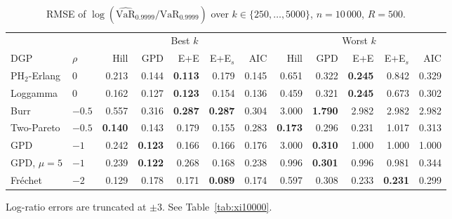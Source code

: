 \begin{table}[t]
\centering
\footnotesize
\setlength{\tabcolsep}{4pt}
\caption{RMSE of $\log(\widehat{\mathrm{VaR}}_{0.9999}/\mathrm{VaR}_{0.9999})$ over $k\in\{250,\dots,5000\}$, $n=10\,000$, $R=500$.}
\label{tab:q10000}
\begin{tabular}{llrrrrrrrrrr}
\toprule
 & & \multicolumn{5}{c}{Best $k$} & \multicolumn{5}{c}{Worst $k$} \\
\cmidrule(lr){3-7} \cmidrule(lr){8-12}
DGP & $\rho$ & Hill & GPD & E+E & E+E$_s$ & AIC & Hill & GPD & E+E & E+E$_s$ & AIC \\
\midrule
PH$_2$-Erlang & $0$ & 0.213 & 0.144 & \textbf{0.113} & 0.179 & 0.145 & 0.651 & 0.322 & \textbf{0.245} & 0.842 & 0.329 \\
Loggamma & $0$ & 0.162 & 0.127 & \textbf{0.123} & 0.154 & 0.136 & 0.459 & 0.321 & \textbf{0.245} & 0.673 & 0.302 \\
Burr & $-0.5$ & 0.557 & 0.316 & \textbf{0.287} & \textbf{0.287} & 0.304 & 3.000 & \textbf{1.790} & 2.982 & 2.982 & 2.982 \\
Two-Pareto & $-0.5$ & \textbf{0.140} & 0.143 & 0.179 & 0.155 & 0.283 & \textbf{0.173} & 0.296 & 0.231 & 1.017 & 0.313 \\
GPD & $-1$ & 0.242 & \textbf{0.123} & 0.166 & 0.166 & 0.176 & 3.000 & \textbf{0.310} & 1.000 & 1.000 & 1.000 \\
GPD, $\mu=5$ & $-1$ & 0.239 & \textbf{0.122} & 0.268 & 0.168 & 0.238 & 0.996 & \textbf{0.301} & 0.996 & 0.981 & 0.344 \\
Fr\'echet & $-2$ & 0.129 & 0.178 & 0.171 & \textbf{0.089} & 0.174 & 0.597 & 0.308 & 0.233 & \textbf{0.231} & 0.299 \\
\bottomrule
\end{tabular}
\par\smallskip
\parbox{\linewidth}{\footnotesize Log-ratio errors are truncated at $\pm 3$. See Table~\ref{tab:xi10000}.}
\end{table}
